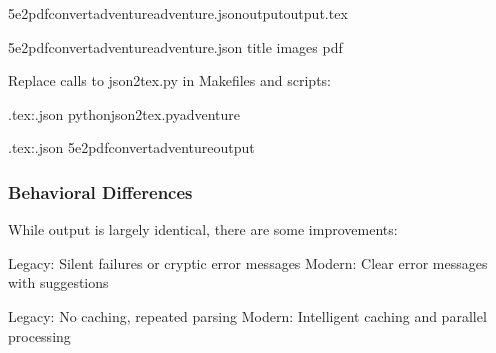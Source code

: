 \documentclass[letterpaper,10pt,english]{sphinxmanual}
\begin{document}
\sphinxAtStartPar
{}

\begin{sphinxVerbatim}[commandchars=\\\{\}]
5e2pdfconvertadventureadventure.json\PYGZhy{}\PYGZhy{}outputoutput.tex

5e2pdfconvertadventureadventure.json
\PYGZhy{}\PYGZhy{}title
\PYGZhy{}\PYGZhy{}images
\PYGZhy{}\PYGZhy{}pdf
\end{sphinxVerbatim}

\sphinxAtStartPar
{}

\sphinxAtStartPar
Replace calls to json2tex.py in Makefiles and scripts:

\begin{sphinxVerbatim}[commandchars=\\\{\}]
\PYGZpc{}.tex:\PYGZpc{}.json
pythonjson2tex.py\PYGZhy{}\PYGZhy{}adventure\PYGZdl{}\PYGZlt{}\PYGZgt{}

\PYGZpc{}.tex:\PYGZpc{}.json
5e2pdfconvertadventure\PYGZdl{}\PYGZlt{}\PYGZhy{}\PYGZhy{}output
\end{sphinxVerbatim}


\subsubsection{Behavioral Differences}
\label{\detokenize{developer/legacy:behavioral-differences}}
\sphinxAtStartPar
While output is largely identical, there are some improvements:

\sphinxAtStartPar
{}
\sphinxhyphen{} Legacy: Silent failures or cryptic error messages
\sphinxhyphen{} Modern: Clear error messages with suggestions

\sphinxAtStartPar
{}
\sphinxhyphen{} Legacy: No caching, repeated parsing
\sphinxhyphen{} Modern: Intelligent caching and parallel processing
\end{document}
